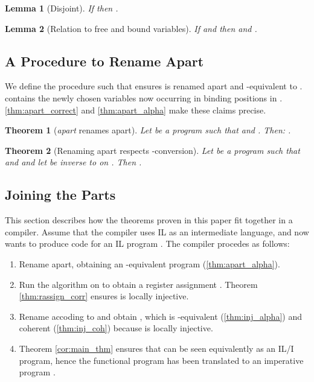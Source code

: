 \documentclass[openright,a4paper,11pt]{scrartcl}
\newcommand{\myref}[1]{\autoref{#1}}
\theoremstyle{plain}
\newtheorem{theorem}{Theorem}
\theoremstyle{plain}
\newtheorem{lemma}{Lemma}
\theoremstyle{plain}
\theoremstyle{plain}
\theoremstyle{nonumberplain}
\begin{document}
\begin{lemma}[Disjoint]
If  then .
\end{lemma}

\begin{lemma}[Relation to free and bound variables]
If  and then  and .
\end{lemma}

\subsection{A Procedure to Rename Apart}

\renewcommand{\ra}[3]{\mathit{apart}\,#1\,#2\,#3}

We define the procedure  such that  ensures  is renamed apart and -equivalent to .  contains the newly chosen variables now occurring in binding positions in .
\myref{thm:apart_correct} and \myref{thm:apart_alpha} make these claims precise.



\begin{theorem}[\textnormal{\textit{apart}} renames apart]
Let  be a program such that  and .
Then: .
\label{thm:apart_correct}
\end{theorem}

\begin{theorem}[Renaming apart respects -conversion]
\label{thm:apart_alpha}
Let  be a program such that  and  and
let  be inverse to  on .
Then .
\end{theorem}

 \subsection{Joining the Parts}
This section describes how the theorems proven in this paper fit together in a compiler.
Assume that the compiler uses IL as an intermediate language, and now wants to produce code for an IL program . The compiler procedes as follows:

\begin{enumerate}
 \item Rename  apart, obtaining an -equivalent program  (\myref{thm:apart_alpha}).
 \item Run the algorithm  on  to obtain a register assignment .
       Theorem \myref{thm:rassign_corr} ensures  is locally injective.
 \item Rename  accoding to  and obtain , which is -equivalent
   (\myref{thm:inj_alpha}) and coherent (\myref{thm:inj_coh}) because  is locally injective.
 \item Theorem \myref{cor:main_thm} ensures that  can be seen equivalently as an IL/I program,
       hence the functional program  has been translated to an imperative program .
\end{enumerate}

\printbibliography
\end{document}
